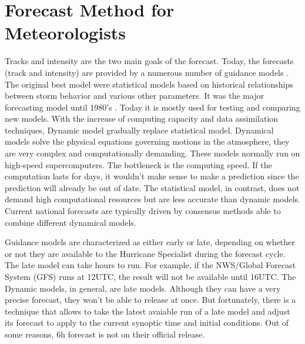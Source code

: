 \section{Forecast Method for Meteorologists}
Tracks and intensity are the two main goals of the forecast. Today, the forecasts (track and intensity) are provided by a numerous number of guidance models \cite{nhc_models}. The original best model were statistical models based on historical relationships between storm behavior and various other parameters. It was the major forecasting model until 1980's \cite{demaria2005further}. Today it is mostly used for testing and comparing new models. With the increase of computing capacity and data assimilation techniques, Dynamic model gradually replace statistical model. Dynamical models solve the physical equations governing motions in the atmosphere, they are very complex and computationally demanding. These models normally run on high-speed supercomputers. The bottleneck is the computing speed. If the computation lasts for days, it wouldn't make sense to make a prediction since the prediction will already be out of date. The statistical model, in contrast, does not demand high computational resources but are less accurate than dynamic models. Current national forecasts are typically driven by consensus methods able to combine different dynamical models.

Guidance models are characterized as either early or late, depending on whether or not they are available to the Hurricane Specialist during the forecast cycle. \cite{nhc_models} The late model can take hours to run. For example, if the NWS/Global Forecast System (GFS) runs at 12UTC, the result will not be available until 16UTC. The Dynamic models, in general, are late models. Although they can have a very precise forecast, they won't be able to release at once. But fortunately, there is a technique that allows to take the latest avaiable run of a late model and adjust its forecast to apply to the current synoptic time and initial conditions\cite{nhc_models}. Out of some reasons, 6h forecast is not on their official release.

